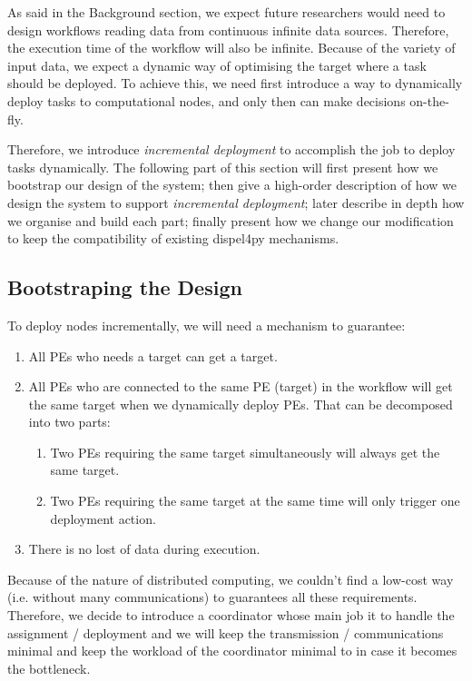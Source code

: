 \documentclass[msc,cs,logo]{infthesis}
\begin{document}
	As said in the Background section, we expect future researchers would need to design workflows reading data from continuous infinite data sources. Therefore, the execution time of the workflow will also be infinite. Because of the variety of input data, we expect a dynamic way of optimising the target where a task should be deployed. To achieve this, we need first introduce a way to dynamically deploy tasks to computational nodes, and only then can make decisions on-the-fly.
	
	Therefore, we introduce \textit{incremental deployment} to accomplish the job to deploy tasks dynamically. The following part of this section will first present how we bootstrap our design of the system; then give a high-order description of how we design the system to support \textit{incremental deployment}; later describe in depth how we organise and build each part; finally present how we change our modification to keep the compatibility of existing dispel4py mechanisms.
	
	\subsection{Bootstraping the Design}
	To deploy nodes incrementally, we will need a mechanism to guarantee:
	\begin{enumerate}
		\item All PEs who needs a target can get a target.
		\item All PEs who are connected to the same PE (target) in the workflow will get the same target when we dynamically deploy PEs. That can be decomposed into two parts:
		\begin{enumerate}
			\item Two PEs requiring  the same target simultaneously will always get the same target.
			\item Two PEs requiring the same target at the same time will only trigger one deployment action.
		\end{enumerate}
		\item There is no lost of data during execution.
	\end{enumerate}
	
	Because of the nature of distributed computing, we couldn't find a low-cost way (i.e. without many communications) to guarantees all these requirements. Therefore, we decide to introduce a coordinator whose main job it to handle the assignment / deployment and we will keep the transmission / communications minimal and keep the workload of the coordinator minimal to in case it becomes the bottleneck.
	
\end{document}
